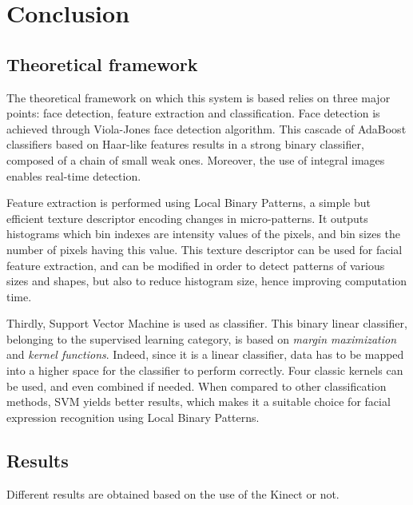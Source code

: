 \chapter{Conclusion}
\label{chap:ccl}
  
\section{Theoretical framework}

\vspace{\baselineskip}
\noindent The theoretical framework on which this system is based relies on three major points: face detection, feature extraction and classification. Face detection is achieved through Viola-Jones face detection algorithm. This cascade of AdaBoost classifiers based on Haar-like features results in a strong binary classifier, composed of a chain of small weak ones. Moreover, the use of integral images enables real-time detection.
\newline

\noindent Feature extraction is performed using Local Binary Patterns, a simple but efficient texture descriptor encoding changes in micro-patterns. It outputs histograms which bin indexes are intensity values of the pixels, and bin sizes the number of pixels having this value. This texture descriptor can be used for facial feature extraction, and can be modified in order to detect patterns of various sizes and shapes, but also to reduce histogram size, hence improving computation time.
\newline

\noindent Thirdly, Support Vector Machine is used as classifier. This binary linear classifier, belonging to the supervised learning category, is based on \textit{margin maximization} and \textit{kernel functions}. Indeed, since it is a linear classifier, data has to be mapped into a higher space for the classifier to perform correctly. Four classic kernels can be used, and even combined if needed. When compared to other classification methods, SVM yields better results, which makes it a suitable choice for facial expression recognition using Local Binary Patterns.
\newline

\section{Results}

\vspace{\baselineskip}
\noindent Different results are obtained based on the use of the Kinect or not.
\newline

